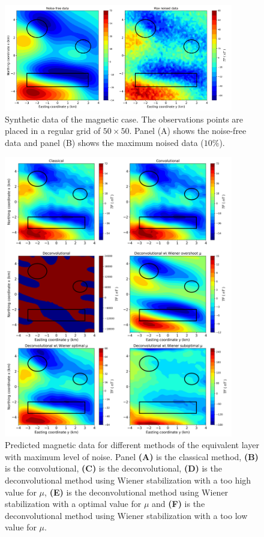 \begin{figure}[htbp]
	\begin{center}
		\includegraphics[width=10cm]{Fig/synthetic_mag}
	\end{center}
	\caption{Synthetic data of the magnetic case. The observations points are placed in a regular grid of $50 \times 50$. Panel (A) shows the noise-free data and panel (B) shows the maximum noised data ($10\%$).}
	\label{fig:7}
\end{figure}

\begin{figure}[htbp]
	\begin{center}
		\includegraphics[width=10cm]{Fig/stability_mag_comparison}
	\end{center}
	\caption{Predicted magnetic data for different methods of the equivalent layer with maximum level of noise. Panel \textbf{(A)} is the classical method, \textbf{(B)} is the convolutional, \textbf{(C)} is the deconvolutional, \textbf{(D)} is the deconvolutional method using Wiener stabilization with a too high value for $\mu$, \textbf{(E)} is the deconvolutional method using Wiener stabilization with a optimal value for $\mu$ and \textbf{(F)} is the deconvolutional method using Wiener stabilization with a too low value for $\mu$.}
	\label{fig:8}
\end{figure}

